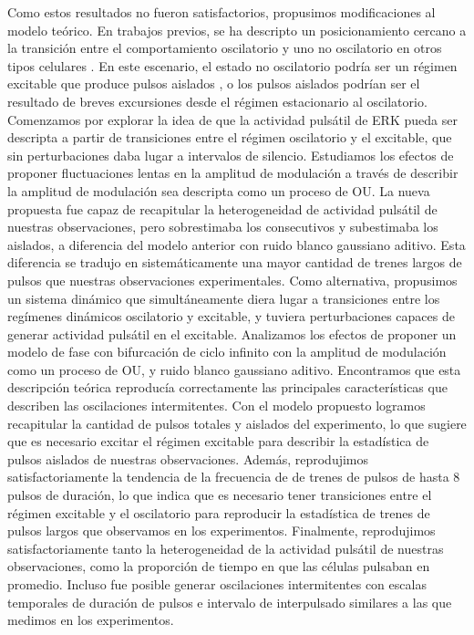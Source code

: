\documentclass[./main.tex]{subfiles}
\begin{document}
Como estos resultados no fueron satisfactorios, propusimos modificaciones al modelo teórico. En trabajos previos, se ha descripto un posicionamiento cercano a la transición entre el comportamiento oscilatorio y uno no oscilatorio en otros tipos celulares \cite{Camalet2000,Eguiluz2000,Westendorf2013,Webb2016}. En este escenario, el estado no oscilatorio podría ser un régimen excitable que produce pulsos aislados \cite{MartinezCorral2018,Monke2017}, o los pulsos aislados podrían ser el resultado de breves excursiones desde el régimen estacionario al oscilatorio. Comenzamos por explorar la idea de que la actividad pulsátil de ERK pueda ser descripta a partir de transiciones entre el régimen oscilatorio y el excitable, que sin perturbaciones daba lugar a intervalos de silencio. Estudiamos los efectos de proponer fluctuaciones lentas en la amplitud de modulación a través de describir la amplitud de modulación sea descripta como un proceso de OU. La nueva propuesta fue capaz de recapitular la heterogeneidad de actividad pulsátil de nuestras observaciones, pero sobrestimaba los consecutivos y subestimaba los aislados, a diferencia del modelo anterior con ruido blanco gaussiano aditivo. Esta diferencia se tradujo en sistemáticamente una mayor cantidad de trenes largos de pulsos que nuestras observaciones experimentales. Como alternativa, propusimos un sistema dinámico que simultáneamente diera lugar a transiciones entre los regímenes dinámicos oscilatorio y excitable, y tuviera perturbaciones capaces de generar actividad pulsátil en el excitable. Analizamos los efectos de proponer un modelo de fase con bifurcación de ciclo infinito con la amplitud de modulación como un proceso de OU, y ruido blanco gaussiano aditivo. Encontramos que esta descripción teórica reproducía correctamente las principales características que describen las oscilaciones intermitentes. Con el modelo propuesto logramos recapitular la cantidad de pulsos totales y aislados del experimento, lo que sugiere que es necesario excitar el régimen excitable para describir la estadística de pulsos aislados de nuestras observaciones. Además, reprodujimos satisfactoriamente la tendencia de la frecuencia de de trenes de pulsos de hasta 8 pulsos de duración, lo que indica que es necesario tener transiciones entre el régimen excitable y el oscilatorio para reproducir la estadística de trenes de pulsos largos que observamos en los experimentos. Finalmente, reprodujimos satisfactoriamente tanto la heterogeneidad de la actividad pulsátil de nuestras observaciones, como la proporción de tiempo en que las células pulsaban en promedio. Incluso fue posible generar oscilaciones intermitentes con escalas temporales de duración de pulsos e intervalo de interpulsado similares a las que medimos en los experimentos. 
\end{document}
